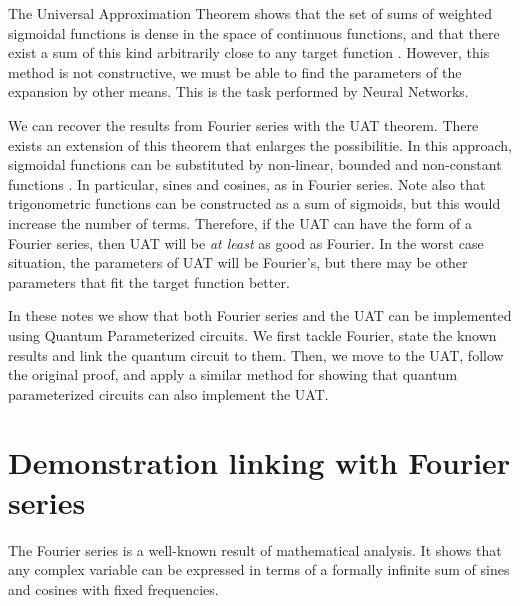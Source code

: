 \documentclass[aps,amssymb,amsmath,amsfonts,pra,superscriptaddress,onecolumn]{revtex4}
\begin{document}
The Universal Approximation Theorem shows that the set of sums of weighted sigmoidal functions is dense in the space of continuous functions, and that there exist a sum of this kind arbitrarily close to any target function \cite{uat-cybenko1989}. However, this method is not constructive, we must be able to find the parameters of the expansion by other means. This is the task performed by Neural Networks.

We can recover the results from Fourier series with the UAT theorem. There exists an extension of this theorem that enlarges the possibilitie. In this approach, sigmoidal functions can be substituted by non-linear, bounded and non-constant functions \cite{uat-hornik1991}. In particular, sines and cosines, as in Fourier series. Note also that trigonometric functions can be constructed as a sum of sigmoids, but this would increase the number of terms. Therefore, if the UAT can have the form of a Fourier series, then UAT will be {\sl at least} as good as Fourier. In the worst case situation, the parameters of UAT will be Fourier's, but there may be other parameters that fit the target function better. 

In these notes we show that both Fourier series and the UAT can be implemented using Quantum Parameterized circuits. We first tackle Fourier, state the known results and link the quantum circuit to them. Then, we move to the UAT, follow the original proof, and apply a similar method for showing that quantum parameterized circuits can also implement the UAT.


\section{Demonstration linking with Fourier series}
The Fourier series is a well-known result of mathematical analysis. It shows that any complex variable can be expressed in terms of a formally infinite sum of sines and cosines with fixed frequencies. 
\end{document}
